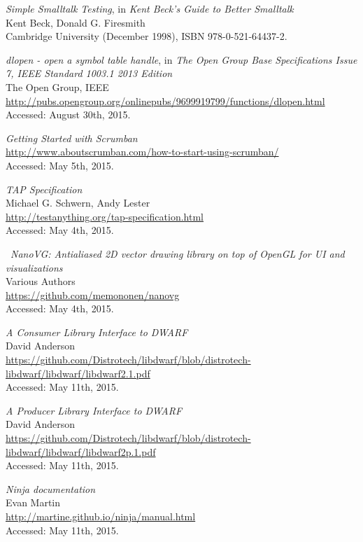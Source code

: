 \begin{thebibliography}{99}
		\emph{Simple Smalltalk Testing}, in \emph{Kent Beck's Guide to Better
		Smalltalk} \\
		Kent Beck, Donald G. Firesmith \\
		Cambridge University (December 1998), ISBN 978-0-521-64437-2.

		\emph{dlopen - open a symbol table handle}, in \emph{The Open Group Base
		Specifications Issue 7, IEEE Standard 1003.1 2013 Edition} \\
		The Open Group, IEEE \\
		\url{http://pubs.opengroup.org/onlinepubs/9699919799/functions/dlopen.html}	\\
		Accessed: August 30th, 2015.

		\emph{Getting Started with Scrumban} \\
		\url{http://www.aboutscrumban.com/how-to-start-using-scrumban/} \\
		Accessed: May 5th, 2015.

		\emph{TAP Specification} \\
		Michael G. Schwern, Andy Lester \\
		\url{http://testanything.org/tap-specification.html} \\
		Accessed: May 4th, 2015.

	 \
		\emph{NanoVG: Antialiased 2D vector drawing library on top of OpenGL for UI
		and visualizations} \\
		Various Authors \\
		\url{https://github.com/memononen/nanovg} \\
		Accessed: May 4th, 2015.

		\emph{A Consumer Library Interface to DWARF} \\
		David Anderson \\
		\url{https://github.com/Distrotech/libdwarf/blob/distrotech-libdwarf/libdwarf/libdwarf2.1.pdf} \\
		Accessed: May 11th, 2015.

		\emph{A Producer Library Interface to DWARF} \\
		David Anderson \\
		\url{https://github.com/Distrotech/libdwarf/blob/distrotech-libdwarf/libdwarf/libdwarf2p.1.pdf} \\
		Accessed: May 11th, 2015.

		\emph{Ninja documentation} \\
		Evan Martin \\
		\url{http://martine.github.io/ninja/manual.html} \\
		Accessed: May 11th, 2015.


\end{thebibliography}
